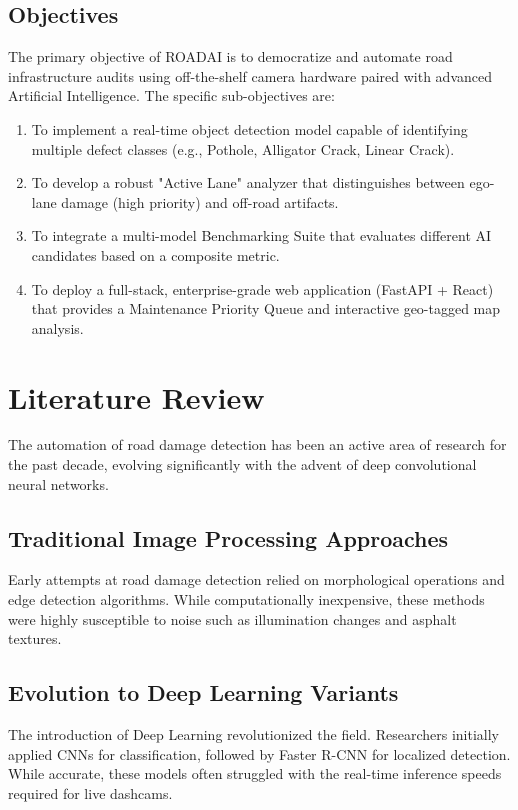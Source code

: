 \documentclass[12pt,a4paper]{report}
\begin{document}
\section{Objectives}
The primary objective of ROADAI is to democratize and automate road infrastructure audits using off-the-shelf camera hardware paired with advanced Artificial Intelligence. The specific sub-objectives are:
\begin{enumerate}
    \item To implement a real-time object detection model capable of identifying multiple defect classes (e.g., Pothole, Alligator Crack, Linear Crack).
    \item To develop a robust "Active Lane" analyzer that distinguishes between ego-lane damage (high priority) and off-road artifacts.
    \item To integrate a multi-model Benchmarking Suite that evaluates different AI candidates based on a composite metric.
    \item To deploy a full-stack, enterprise-grade web application (FastAPI + React) that provides a Maintenance Priority Queue and interactive geo-tagged map analysis.
\end{enumerate}

\chapter{Literature Review}

The automation of road damage detection has been an active area of research for the past decade, evolving significantly with the advent of deep convolutional neural networks.

\section{Traditional Image Processing Approaches}
Early attempts at road damage detection relied on morphological operations and edge detection algorithms. While computationally inexpensive, these methods were highly susceptible to noise such as illumination changes and asphalt textures.

\section{Evolution to Deep Learning Variants}
The introduction of Deep Learning revolutionized the field. Researchers initially applied CNNs for classification, followed by Faster R-CNN for localized detection. While accurate, these models often struggled with the real-time inference speeds required for live dashcams.
\end{document}
